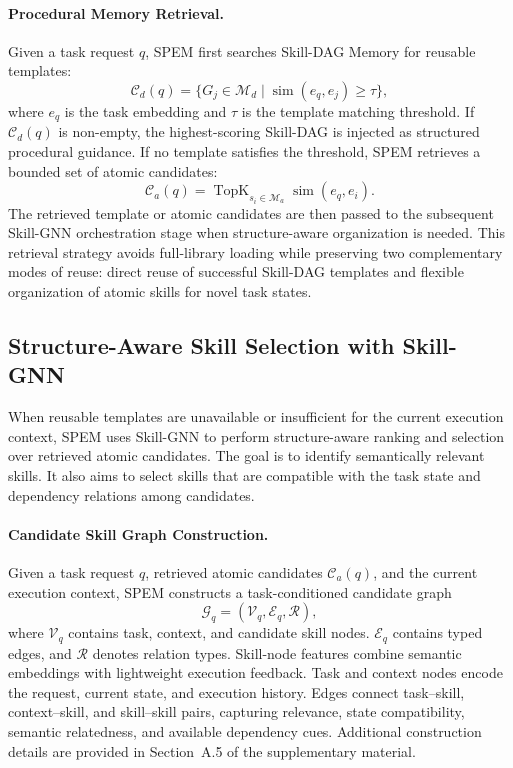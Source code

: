 \documentclass[letterpaper]{article} %
\newcommand{\model}{\textsc{SPEM}}
\begin{document}
\paragraph{Procedural Memory Retrieval.}
Given a task request $q$, \model{} first searches Skill-DAG Memory for reusable templates:
\begin{equation}
\mathcal{C}_{d}(q)=
\{G_j \in \mathcal{M}_{d}\mid \operatorname{sim}(e_q,e_j)\geq \tau\},
\end{equation}
where $e_q$ is the task embedding and $\tau$ is the template matching threshold. If $\mathcal{C}_{d}(q)$ is non-empty, the highest-scoring Skill-DAG is injected as structured procedural guidance. If no template satisfies the threshold, \model{} retrieves a bounded set of atomic candidates:
\begin{equation}
\mathcal{C}_{a}(q)=
\operatorname{TopK}_{s_i\in\mathcal{M}_{a}}
\operatorname{sim}(e_q,e_i).
\end{equation}
The retrieved template or atomic candidates are then passed to the subsequent Skill-GNN orchestration stage when structure-aware organization is needed. This retrieval strategy avoids full-library loading while preserving two complementary modes of reuse: direct reuse of successful Skill-DAG templates and flexible organization of atomic skills for novel task states.


\subsection{Structure-Aware Skill Selection with Skill-GNN}

When reusable templates are unavailable or insufficient for the current execution context, \model{} uses Skill-GNN to perform structure-aware ranking and selection over retrieved atomic candidates. The goal is to identify semantically relevant skills. It also aims to select skills that are compatible with the task state and dependency relations among candidates.

\paragraph{Candidate Skill Graph Construction.}
Given a task request $q$, retrieved atomic candidates $\mathcal{C}_{a}(q)$, and
the current execution context, \model{} constructs a task-conditioned candidate
graph
\begin{equation}
\mathcal{G}_{q}=(\mathcal{V}_{q},\mathcal{E}_{q},\mathcal{R}),
\end{equation}
where $\mathcal{V}_{q}$ contains task, context, and candidate skill nodes.
$\mathcal{E}_{q}$ contains typed edges, and $\mathcal{R}$ denotes relation
types. Skill-node features combine semantic embeddings with lightweight
execution feedback. Task and context nodes encode the request, current
state, and execution history. Edges connect task--skill, context--skill, and
skill--skill pairs, capturing relevance, state compatibility, semantic
relatedness, and available dependency cues. Additional construction details are
provided in Section~A.5 of the
supplementary material.
\end{document}
